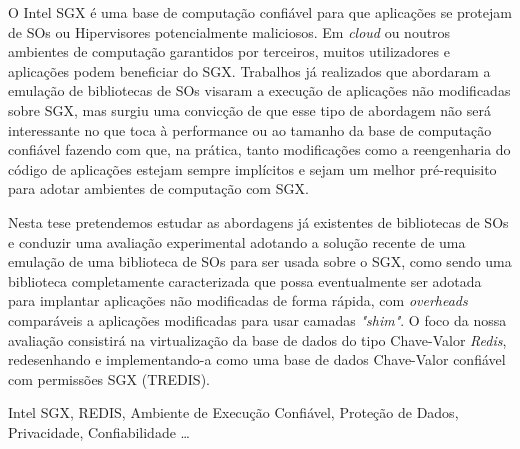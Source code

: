 
	O Intel SGX é uma base de computação confiável para que aplicações se protejam de SOs ou Hipervisores potencialmente maliciosos. Em \textit{cloud} ou noutros ambientes de computação garantidos por terceiros, muitos utilizadores e aplicações podem beneficiar do SGX. Trabalhos já realizados que abordaram a emulação de bibliotecas de SOs visaram a execução de aplicações não modificadas sobre SGX, mas surgiu uma convicção de que esse tipo de abordagem não será interessante no que toca à performance ou ao tamanho da base de computação confiável fazendo com que, na prática, tanto modificações como a reengenharia do código de aplicações estejam sempre implícitos e sejam um melhor pré-requisito para adotar ambientes de computação com SGX.
	
	Nesta tese pretendemos estudar as abordagens já existentes de bibliotecas de SOs e conduzir uma avaliação experimental adotando a solução recente de uma emulação de uma biblioteca de SOs para ser usada sobre o SGX, como sendo uma biblioteca completamente caracterizada que possa eventualmente ser adotada para implantar aplicações não modificadas de forma rápida, com \textit{overheads} comparáveis a aplicações modificadas para usar camadas \textit{"shim"}. O foco da nossa avaliação consistirá na virtualização da base de dados do tipo Chave-Valor  \textit{Redis}, redesenhando e implementando-a como uma base de dados Chave-Valor confiável com permissões SGX (TREDIS).
	
\begin{keywords}
Intel SGX, REDIS, Ambiente de Execução Confiável, Proteção de Dados, Privacidade, Confiabilidade \ldots
\end{keywords}


	
